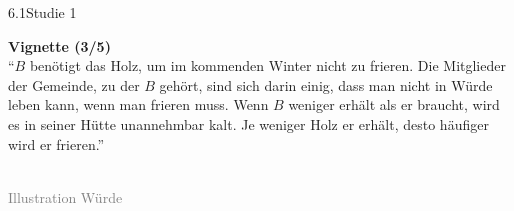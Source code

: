 \documentclass[xcolor=table,9pt,aspectratio=169]{beamer}
\begin{document}
\begin{frame}{\vspace*{10mm}6.1\hspace*{1em}Studie 1}
\begin{multicols}{2}
   \textbf{Vignette (3/5)}\\
   \medskip
   \enquote{$B$ benötigt das Holz, um im kommenden Winter nicht zu frieren.
Die Mitglieder der Gemeinde, zu der $B$ gehört, sind sich darin einig, dass man nicht in Würde leben kann, wenn man frieren muss. Wenn $B$ weniger erhält als er braucht, wird es in seiner Hütte unannehmbar kalt. Je weniger Holz er erhält, desto häufiger wird er frieren.}
   \vfill
   \begin{center}
      \\
      \footnotesize{\textcolor{gray}{Illustration Würde}}
   \end{center}
\end{multicols}
\end{frame}
\end{document}
